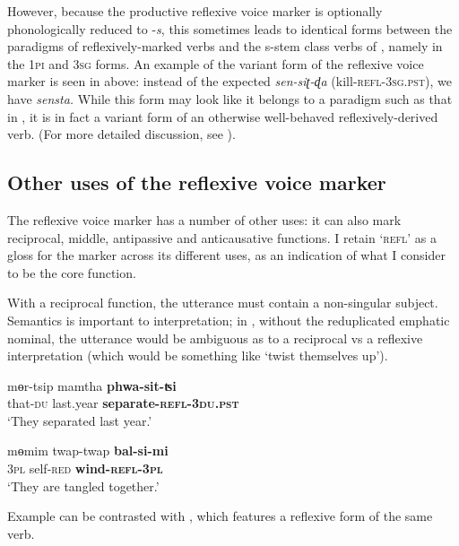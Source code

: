 \documentclass[output=paper]{langscibook}
\begin{document}
However, because the productive reflexive voice marker is optionally phonologically reduced to -\textit{s}, this sometimes leads to identical forms between the paradigms of reflexively-marked verbs and the s-stem class verbs of , namely in the 1\textsc{pi} and 3\textsc{sg} forms. An example of the variant form of the reflexive voice marker is seen in  above: instead of the expected \textit{sen-siʈ-ɖa} (kill-\textsc{refl}-3\textsc{sg}.\textsc{pst}), we have \textit{sensta.} While this form may look like it belongs to a paradigm such as that in , it is in fact a variant form of an otherwise well-behaved reflexively-derived verb. (For more detailed discussion, see \citealt{Lahaussois2011, Lahaussois2016}).

\subsection{Other uses of the reflexive voice marker}
\label{sec:Lahaussois:3.2}

The reflexive voice marker has a number of other uses: it can also mark reciprocal, middle, antipassive and anticausative functions. I retain ‘\textsc{refl}' as a gloss for the marker across its different uses, as an indication of what I consider to be the core function. 

With a reciprocal function, the utterance must contain a non-singular subject.  Semantics is important to interpretation; in , without the reduplicated emphatic nominal, the utterance would be ambiguous as to a reciprocal vs a reflexive interpretation (which would be something like ‘twist themselves up'). 

\ea%
    \label{ex:Lahaussois:12}
    \gll  mɵr-tsip mamtha \textbf{phwa-sit-ʦi}\\
        that-\textsc{du} last.year \textbf{separate-\textsc{refl-3du.pst}}\\
    \glt ‘They separated last year.'
    \z

\ea%
    \label{ex:Lahaussois:13}
    \gll mɵmim twap-twap \textbf{bal-si-mi}\\
        3\textsc{pl} self-\textsc{red} \textbf{wind-\textsc{refl-3pl}}\\
    \glt ‘They are tangled together.'
    \z

Example  can be contrasted with , which features a reflexive form of the same verb.
\end{document}
